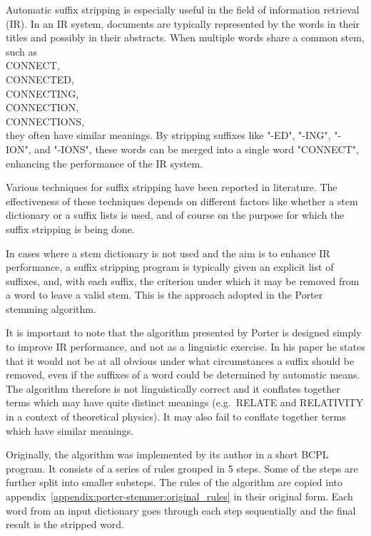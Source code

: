 \documentclass{article}
\begin{document}
	Automatic suffix stripping is especially useful in the field of information retrieval (IR). In an IR system, documents are typically represented by the words in their titles and possibly in their abstracts. When multiple words share a common stem, such as \\
			\indent CONNECT,\\
			\indent CONNECTED,\\
			\indent CONNECTING,\\
			\indent CONNECTION,\\
			\indent CONNECTIONS,\\
	they often have similar meanings. By stripping suffixes like "-ED", "-ING", "-ION", and "-IONS", these words can be merged into a single word "CONNECT", enhancing the performance of the IR system.
	
	Various techniques for suffix stripping have been reported in literature. The effectiveness of these techniques depends on different factors like whether a stem dictionary or a suffix lists is used, and of course on the purpose for which the suffix stripping is being done.
	
	In cases where a stem dictionary is not used and the aim is to enhance IR performance, a suffix stripping program is typically given an explicit list of suffixes, and, with each suffix, the criterion under which it may be removed from a word to leave a valid stem. This is the approach adopted in the Porter stemming algorithm.
	
	It is important to note that the algorithm presented by Porter is designed simply to improve IR performance, and not as a linguistic exercise. In his paper he states that it would not be at all obvious under what circumstances a suffix should be removed, even if the suffixes of a word could be determined by automatic means. The algorithm therefore is not linguistically correct and it conflates together terms which may have quite distinct meanings (e.g.\ RELATE and RELATIVITY in a context of theoretical physics). It may also fail to conflate together terms which have similar meanings.
	
	Originally, the algorithm was implemented by its author in a short BCPL program. It consists of a series of rules grouped in 5 steps. Some of the steps are further split into smaller substeps.
	The rules of the algorithm are copied into appendix~\ref{appendix:porter-stemmer:original_rules} in their original form.
	Each word from an input dictionary goes through each step sequentially and the final result is the stripped word.
	
\end{document}
